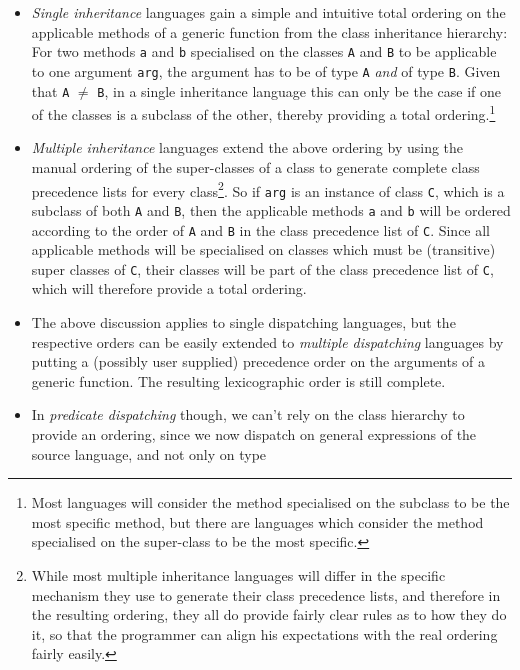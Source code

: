 \documentclass[a4paper,11pt]{scrartcl}
\begin{document}
\begin{itemize}
\item \emph{Single inheritance} languages gain a simple and intuitive
  total ordering on the applicable methods of a generic function from
  the class inheritance hierarchy:  For two methods \texttt{a} and
  \texttt{b} specialised on the classes \texttt{A} and \texttt{B} to
  be applicable to one argument \texttt{arg}, the argument has to be
  of type \texttt{A} \emph{and} of type \texttt{B}.  Given that
  \texttt{A} $\neq$ \texttt{B}, in a single inheritance language this
  can only be the case if one of the classes is a subclass of the
  other, thereby providing a total ordering.\footnote{Most languages
    will consider the method specialised on the subclass to be the
    most specific method, but there are languages which consider the
    method specialised on the super-class to be the most specific.}
\item \emph{Multiple inheritance} languages extend the above ordering
  by using the manual ordering of the super-classes of a class to
  generate complete class precedence lists for every
  class\footnote{While most multiple inheritance languages will differ
    in the specific mechanism they use to generate their class
    precedence lists, and therefore in the resulting ordering, they
    all do provide fairly clear rules as to how they do it, so that
    the programmer can align his expectations with the real ordering
    fairly easily.}.
  So if \texttt{arg} is an instance of class \texttt{C}, which is a
  subclass of both \texttt{A} and \texttt{B}, then the applicable
  methods \texttt{a} and \texttt{b} will be ordered according to the
  order of \texttt{A} and \texttt{B} in the class precedence list of
  \texttt{C}.  Since all applicable methods will be specialised on
  classes which must be (transitive) super classes of \texttt{C},
  their classes will be part of the class precedence list of
  \texttt{C}, which will therefore provide a total ordering.
\item The above discussion applies to single dispatching languages,
  but the respective orders can be easily extended to \emph{multiple
    dispatching} languages by putting a (possibly user supplied)
  precedence order on the arguments of a generic function.  The
  resulting lexicographic order is still complete.
\item In \emph{predicate dispatching} though, we can't rely on the
  class hierarchy to provide an ordering, since we now dispatch on
  general expressions of the source language, and not only on type

\end{itemize}
\end{document}

